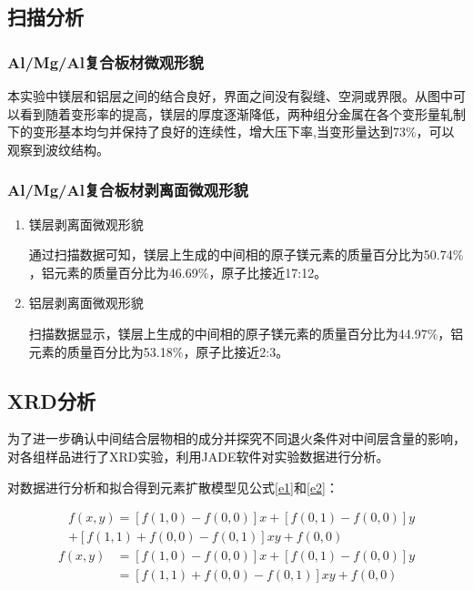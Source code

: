 	\subsection{扫描分析}			
		\subsubsection{Al/Mg/Al复合板材微观形貌}
		本实验中镁层和铝层之间的结合良好，界面之间没有裂缝、空洞或界限。从图中可以看到随着变形率的提高，镁层的厚度逐渐降低，两种组分金属在各个变形量轧制下的变形基本均匀并保持了良好的连续性，增大压下率,当变形量达到73$\%$，可以观察到波纹结构。\par
		\subsubsection{Al/Mg/Al复合板材剥离面微观形貌}
		\begin{enumerate}
			\item 镁层剥离面微观形貌
			
			通过扫描数据可知，镁层上生成的中间相的原子镁元素的质量百分比为50.74$\%$，铝元素的质量百分比为46.69$\%$，原子比接近17:12。
			
			\item 铝层剥离面微观形貌
			
			扫描数据显示，镁层上生成的中间相的原子镁元素的质量百分比为44.97$\%$，铝元素的质量百分比为53.18$\%$，原子比接近2:3。
		\end{enumerate}
	\subsection{XRD分析}	
		为了进一步确认中间结合层物相的成分并探究不同退火条件对中间层含量的影响，对各组样品进行了XRD实验，利用JADE软件对实验数据进行分析。\par
		对数据进行分析和拟合得到元素扩散模型见公式\eqref{e1}和\eqref{e2}：\par
	\vspace{-2em}
	\begin{equation} \label{e1}
		\begin{split}
			&f(x,y)=[f(1,0)-f(0,0)]x+[f(0,1)-f(0,0)]y \\
			&+[f(1,1)+f(0,0)-f(0,1)]xy+f(0,0) 
		\end{split}
	\end{equation}
	\vspace{-1em}
	\begin{equation} \label{e2}
		\begin{split}
			f(x,y)&=[f(1,0)-f(0,0)]x+[f(0,1)-f(0,0)]y \\
			&=[f(1,1)+f(0,0)-f(0,1)]xy+f(0,0) 
		\end{split}
	\end{equation}	
		
 \clearpage